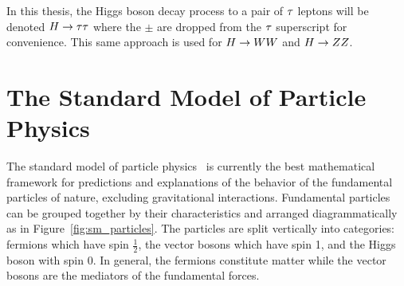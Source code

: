 
In this thesis, the Higgs boson decay process to a pair of $\tau$ leptons will be denoted
$H\to\tau\tau$ where the $\pm$ are dropped from the $\tau$ superscript
for convenience. This same approach is used for $H\to WW$ and $H\to ZZ$.


\section{The Standard Model of Particle Physics}
The standard model of particle physics~\cite{Glashow:1961tr,SM1,SM3} is currently
the best mathematical framework for predictions and explanations of the behavior
of the fundamental particles of nature, excluding gravitational interactions. Fundamental particles can be grouped
together by their characteristics and arranged diagrammatically as in
Figure~\ref{fig:sm_particles}. The particles are split vertically into categories:
fermions which have spin $\frac{1}{2}$, the vector bosons which have spin 1, and
the Higgs boson with spin 0. In general, the fermions constitute 
matter while the vector bosons are the mediators of the fundamental forces.

